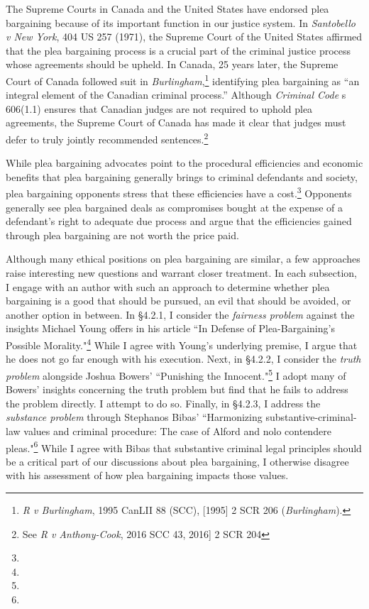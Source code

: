 The Supreme Courts in Canada and the United States have endorsed plea bargaining because of its important function in our justice system. In \textit{Santobello v New York}, 404 US 257 (1971), the Supreme Court of the United States affirmed that the plea bargaining process is a crucial part of the criminal justice process whose agreements should be upheld. In Canada, 25 years later, the Supreme Court of Canada followed suit in \textit{Burlingham},\footnote{\textit{R v Burlingham}, 1995 CanLII 88 (SCC), [1995] 2 SCR 206 (\textit{Burlingham}).} identifying plea bargaining as ``an integral element of the Canadian criminal process.'' Although \textit{Criminal Code} s 606(1.1) ensures that Canadian judges are not required to uphold plea agreements, the Supreme Court of Canada has made it clear that judges must defer to truly jointly recommended sentences.\footnote{See \textit{R v Anthony-Cook}, 2016 SCC 43, 2016] 2 SCR 204}

While plea bargaining advocates point to the procedural efficiencies and economic benefits that plea bargaining generally brings to criminal defendants and society, plea bargaining opponents stress that these efficiencies have a cost.\footnote{} Opponents generally see plea bargained deals as compromises bought at the expense of a defendant's right to adequate due process and argue that the efficiencies gained through plea bargaining are not worth the price paid.

Although many ethical positions on plea bargaining are similar, a few approaches raise interesting new questions and warrant closer treatment. In each subsection, I engage with an author with such an approach to determine whether plea bargaining is a good that should be pursued, an evil that should be avoided, or another option in between. In \S 4.2.1, I consider the \textit{fairness problem} against the insights Michael Young offers in his article ``In Defense of Plea-Bargaining's Possible Morality."\footnote{} While I agree with Young's underlying premise, I argue that he does not go far enough with his execution. Next, in \S 4.2.2, I consider the \textit{truth problem} alongside Joshua Bowers' ``Punishing the Innocent."\footnote{} I adopt many of Bowers' insights concerning the truth problem but find that he fails to address the problem directly. I attempt to do so. Finally, in \S 4.2.3, I address the \textit{substance problem} through Stephanos Bibas' ``Harmonizing substantive-criminal-law values and criminal procedure: The case of Alford and nolo contendere pleas."\footnote{} While I agree with Bibas that substantive criminal legal principles should be a critical part of our discussions about plea bargaining, I otherwise disagree with his assessment of how plea bargaining impacts those values.

